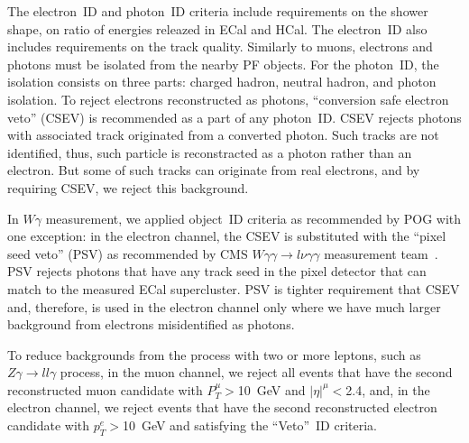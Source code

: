 The electron~ID and photon~ID criteria include requirements on the shower shape, on ratio of energies releazed in ECal and HCal. The electron~ID also includes requirements on the track quality. Similarly to muons, electrons and photons must be isolated from the nearby PF objects. For the photon~ID, the isolation consists on three parts: charged hadron, neutral hadron, and photon isolation. To reject electrons reconstructed as photons, ``conversion safe electron veto'' (CSEV) is recommended as a part of any photon~ID. CSEV rejects photons with associated track originated from a converted photon. Such tracks are not identified, thus, such particle is reconstracted as a photon rather than an electron. But some of such tracks can originate from real electrons, and by requiring CSEV, we reject this background.



In $W\gamma$ measurement, we applied object~ID criteria as recommended by POG with one exception: in the electron channel, the CSEV is substituted with the ``pixel seed veto'' (PSV) as recommended by CMS $W\gamma\gamma \rightarrow l\nu\gamma\gamma$ measurement team~\cite{ref_Wgg8TeV}. PSV rejects photons that have any track seed in the pixel detector that can match to the measured ECal supercluster. PSV is tighter requirement that CSEV and, therefore, is used in the electron channel only where we have much larger background from electrons misidentified as photons. %

To reduce backgrounds from the process with two or more leptons, such as $Z\gamma\rightarrow l l \gamma$ process, in the muon channel, we reject all events that have the second reconstructed muon candidate with $P_T^{\mu}>$10~GeV and $|\eta|^{\mu}<$2.4, and, in the electron channel, we reject events that have the second reconstructed electron candidate with $p_T^e>$10~GeV and satisfying the ``Veto''~ID criteria.

